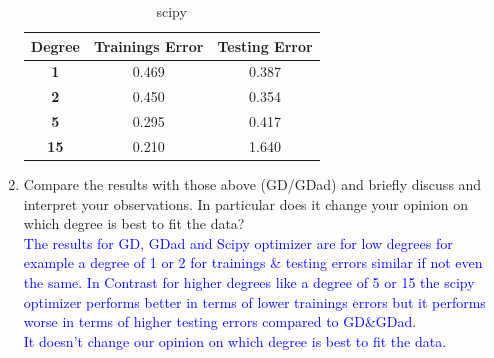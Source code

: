 \documentclass[a4paper]{article}
\begin{document}
\begin{enumerate}
\begin{minipage}[b]{0.4\textwidth}
  \label{scipy_gradient_descent_15_1_1000}
\end{minipage}
\begin{table}[!h]
\centering
\caption{scipy}
\begin{tabular}{|c|c|c|}
\hline
\textbf{Degree} & \textbf{Trainings Error} & \textbf{Testing Error} \\ \hline
\textbf{1}      & 0.469                  & 0.387                  \\ \hline
\textbf{2}      & 0.450                  & 0.354                  \\ \hline
\textbf{5}      & 0.295                  & 0.417                  \\ \hline
\textbf{15}     & 0.210                  & 1.640                  \\ \hline
\end{tabular}
\end{table}
\item  Compare the results with those above (GD/GDad) and briefly discuss and interpret your observations. In particular does it change your opinion on which degree is best to fit the data?\\
\textcolor{blue}{The results for GD, GDad and Scipy optimizer are  for low degrees for example a degree of 1 or 2 for trainings \& testing errors similar if not even the same. In Contrast for higher degrees like a degree of 5 or 15 the scipy optimizer performs better in terms of lower trainings errors but it performs worse in terms of higher testing errors compared to  GD\&GDad.\\
It doesn't change our opinion on which degree is best to fit the data.}
\end{enumerate}
\end{document}
